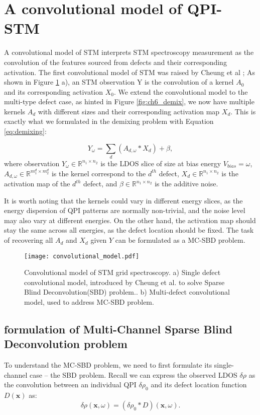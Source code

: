 \section{A convolutional model of QPI-STM}
A convolutional model of STM interprets STM spectroscopy measurement as the convolution of the features sourced from defects and their corresponding activation. The first convolutional model of STM was raised by Cheung et al \cite{cheungDictionaryLearningFouriertransform2020}; As shown in Figure \ref{fig:ch6_conv} a), an STM observation Y is the convolution of a kernel $A_0$ and its corresponding activation $X_0$. We extend the convolutional model to the multi-type defect case, as hinted in Figure \ref{fig:ch6_demix}, we now have multiple kernels $A_d$ with different sizes and their corresponding activation map $X_d$. This is exactly what we formulated in the demixing problem with Equation \ref{eq:demixing}:

\begin{equation}
	Y_{\omega} = \sum_d ( A_{d,{\omega}} * X_d) + \beta,
\end{equation}
\noindent where observation $Y_{\omega} \in \mathbb{R}^{n_1 \times n_2}$ is the \ac{LDOS} slice of size at bias energy $V_{bias} = \omega$, $A_{d,{\omega}} \in \mathbb{R}^{m_1^d \times m_2^d}$ is the kernel correspond to the $d^{th}$ defect, $X_{d} \in \mathbb{R}^{n_1 \times n_2}$ is the activation map of the $d^{th}$ defect, and $\beta \in \mathbb{R}^{n_1 \times n_2}$ is the additive noise. 

\noindent It is worth noting that the kernels could vary in different energy slices, as the energy dispersion of QPI patterns are normally non-trivial, and the noise level may also vary at different energies. On the other hand, the activation map should stay the same across all energies, as the defect location should be fixed. The task of recovering all $A_d$ and $X_d$ given $Y$ can be formulated as a \ac{MC-SBD} problem. 
 
\begin{figure}
	\texttt{[image: convolutional\_model.pdf]} 
	\centering
	\caption{Convolutional model of STM grid spectroscopy. a) Single defect convolutional model, introduced by Cheung et al. to solve Sparse Blind Deconvolution(SBD) problem.\cite{cheungDictionaryLearningFouriertransform2020}. b) Multi-defect convolutional model, used to address \ac{MC-SBD} problem.}
	\label{fig:ch6_conv}
\end{figure}


\subsection{formulation of Multi-Channel Sparse Blind Deconvolution problem}
To understand the \ac{MC-SBD} problem, we need to first formulate its single-channel case --  the \ac{SBD} problem. Recall we can express the observed \ac{LDOS} $\delta\rho$ as the convolution between an individual QPI $\delta\rho_0$ and its defect location function $D(\mathbf{x})$ as: 
\begin{equation}
	\delta \rho(\mathbf{x}, \omega) = (\delta \rho_0 *D)(\mathbf{x}, \omega).
\end{equation}

